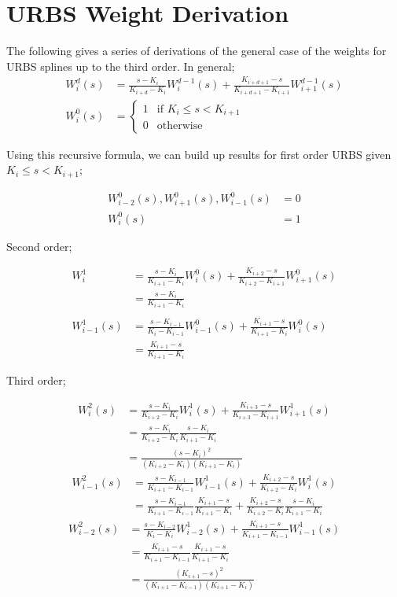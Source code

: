 \chapter{URBS Weight Derivation}
The following \cite{website:nurbsExplain} gives a series of derivations of the general case of the weights for URBS splines up to the third order.
In general;
\begin{align*}
W^d_{i}(s) &=   \frac{s - K_i}{K_{i+d} - K_i}W^{d-1}_{i}(s)  +  \frac{K_{i + d + 1} - s}{K_{i + d + 1} - K_{i+1}}W^{d-1}_{i+1}(s)\\
W^0_{i}(s) &= \begin{cases}
   1 & \text{if } K_i \leq s < K_{i+1} \\
   0 & \text{otherwise}
  \end{cases}	
\end{align*}

Using this recursive formula, we can build up results for first order URBS given $K_i \leq s < K_{i+1}$;

\begin{align*}	
W^0_{i-2}(s),W^0_{i+1}(s), W^0_{i-1}(s) &= 0\\
W^0_{i}(s) &= 1 
\end{align*}

Second order;

\begin{align*}	
W^1_{i} &= \frac{s - K_i}{K_{i+1} - K_i}W^0_{i}(s)  +  \frac{K_{i + 2} - s}{K_{i + 2} - K_{i+1}}W^0_{i+1}(s)\\
	 &= \frac{s - K_i}{K_{i+1} - K_i}\\
	 \\
W^1_{i-1}(s) &=   \frac{s - K_{i-1}}{K_{i} - K_{i-1}}W^0_{i-1}(s)  +  \frac{K_{i + 1} - s}{K_{i + 1} - K_{i}}W^0_{i}(s)\\
	&=\frac{K_{i + 1} - s}{K_{i + 1} - K_{i}}
\end{align*}

Third order;

\begin{align*}
W^2_{i}(s) &= \frac{s - K_i}{K_{i+2} - K_i}W^1_{i}(s)  +  \frac{K_{i + 3} - s}{K_{i + 3} - K_{i+1}}W^1_{i+1}(s)\\ 
	&=   \frac{s - K_i}{K_{i+2} - K_i}\frac{s - K_i}{K_{i+1} - K_i}\\ 
	&= \frac{(s - K_i)^2}{(K_{i+2} - K_i)(K_{i+1} - K_i)}
\end{align*}
\begin{align*}
W^2_{i-1}(s) &= \frac{s - K_{i-1}}{K_{i+1} - K_{i-1}}W^1_{i-1}(s)  +  \frac{K_{i + 2} - s}{K_{i + 2} - K_{i}}W^1_{i}(s)\\ 
	 &= \frac{s - K_{i-1}}{K_{i+1} - K_{i-1}}\frac{K_{i + 1} - s}{K_{i + 1} - K_{i}} +  \frac{K_{i + 2} - s}{K_{i + 2} - K_{i}}\frac{s - K_i}{K_{i+1} - K_i}
\end{align*}
\begin{align*}
W^2_{i-2}(s) &= \frac{s - K_{i-2}}{K_{i} - K_{i}}W^1_{i-2}(s)  +  \frac{K_{i + 1} - s}{K_{i + 1} - K_{i-1}}W^1_{i-1}(s)\\
	&=\frac{K_{i + 1} - s}{K_{i + 1} - K_{i-1}}\frac{K_{i + 1} - s}{K_{i + 1} - K_{i}}\\
&=\frac{(K_{i + 1} - s)^2}{(K_{i + 1} - K_{i-1})(K_{i + 1} - K_{i})}
\end{align*}

